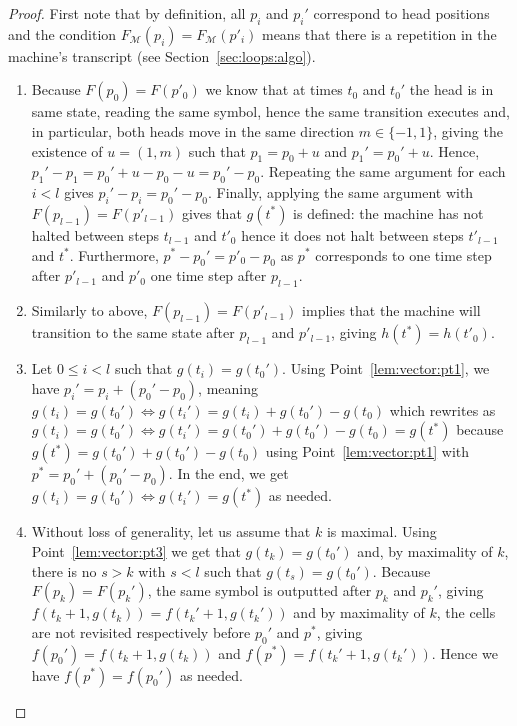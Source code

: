 \begin{proof}
    First note that by definition, all $p_i$ and $p_i'$ correspond to head positions and the condition $F_\mathcal{M}(p_i)   = F_\mathcal{M}(p'_i)$ means that there is a repetition in the machine's transcript (see Section~\ref{sec:loops:algo}).
    \begin{enumerate}
        \item Because $F(p_0) = F(p'_0)$ we know that at times $t_0$ and $t_0'$ the head is in same state, reading the same symbol, hence the same transition executes and, in particular, both heads move in the same direction $m \in \{-1,1\}$, giving the existence of $u = (1, m)$ such that $p_1 = p_0 + u$ and $p_1' = p_0' + u$. Hence, $p_1' - p_1 = p_0' + u - p_0 - u = p_0' - p_0$. Repeating the same argument for each $i < l$ gives $p_i' - p_i = p_0' - p_0$. Finally, applying the same argument with $F(p_{l-1}) = F(p'_{l-1})$ gives that $g(t^*)$ is defined: the machine has not halted between steps $t_{l-1}$ and $t'_0$ hence it does not halt between steps $t'_{l-1}$ and $t^*$. Furthermore, $p^*-p_0' = p'_0 - p_0$ as $p^*$ corresponds to one time step after $p'_{l-1}$ and $p'_0$ one time step after $p_{l-1}$.
        \item Similarly to above, $F(p_{l-1}) = F(p'_{l-1})$ implies that the machine will transition to the same state after $p_{l-1}$ and $p'_{l-1}$, giving $h(t^*) = h(t'_0)$.

        \item Let $0 \leq i < l$ such that $g(t_i) = g(t_0')$. Using Point~\ref{lem:vector:pt1}, we have $p_i' = p_i + (p_0' - p_0)$, meaning $g(t_i) = g(t_0') \Leftrightarrow g(t_i') = g(t_i) + g(t_0') - g(t_0)$ which rewrites as $g(t_i) = g(t_0') \Leftrightarrow g(t_i') = g(t_0') + g(t_0') - g(t_0) = g(t^*)$ because $g(t^*) = g(t_0') + g(t_0') - g(t_0)$ using Point~\ref{lem:vector:pt1} with $p^* = p_0' + (p_0' - p_0)$. In the end, we get $g(t_i) = g(t_0') \Leftrightarrow g(t_i') = g(t^*)$ as needed.

        \item Without loss of generality, let us assume that $k$ is maximal. Using Point~\ref{lem:vector:pt3} we get that $g(t_k) = g(t_0')$ and, by maximality of $k$, there is no $s > k$ with $s <l$ such that $g(t_s) = g(t_0')$. Because $F(p_k) = F(p_k')$, the same symbol is outputted after $p_k$ and $p_k'$, giving $f(t_k+1,g(t_k)) = f(t_k'+1,g(t_k'))$ and by maximality of $k$, the cells are not revisited respectively before $p_0'$ and $p^*$, giving $f(p_0') = f(t_k+1,g(t_k))$ and $f(p^*) = f(t_k'+1,g(t_k'))$. Hence we have $f(p^*) = f(p_0')$ as needed.


    \end{enumerate}

\end{proof}

